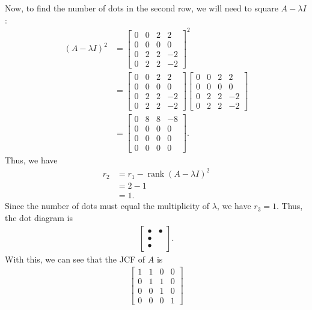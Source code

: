 \documentclass[10pt,a4paper]{article}
\theoremstyle{definition}
\DeclareMathOperator\rank{rank}
\begin{document}
Now, to find the number of dots in the second row, we will need to square $A - \lambda I$:
\begin{align*}
(A - \lambda I)^2 &= \begin{bmatrix}
0 &0 &2 &2\\
0 &0 &0 &0\\
0 &2 &2 &-2\\
0 &2 &2 &-2
\end{bmatrix}^2\\
&= \begin{bmatrix}
0 &0 &2 &2\\
0 &0 &0 &0\\
0 &2 &2 &-2\\
0 &2 &2 &-2
\end{bmatrix} \begin{bmatrix}
0 &0 &2 &2\\
0 &0 &0 &0\\
0 &2 &2 &-2\\
0 &2 &2 &-2
\end{bmatrix}\\
&= \begin{bmatrix}
0 &8 &8 &-8\\
0 &0 &0 &0\\
0 &0 &0 &0\\
0 &0 &0 &0
\end{bmatrix}.
\end{align*}
Thus, we have
\begin{align*}
r_2 &= r_1 - \rank (A - \lambda I)^2\\
&= 2 - 1\\
&= 1.
\end{align*}
Since the number of dots must equal the multiplicity of $\lambda$, we have $r_3 = 1$. Thus, the dot diagram is
\begin{align*}
\begin{bmatrix}
\bullet & \bullet\\
\bullet & \\
\bullet & 
\end{bmatrix}.
\end{align*}
With this, we can see that the JCF of $A$ is 
\begin{align*}
\begin{bmatrix}
1 &1 &0 &0\\
0 &1 &1 &0\\
0 &0 &1 &0\\
0 &0 &0 &1
\end{bmatrix}
\end{align*}
\end{document}
